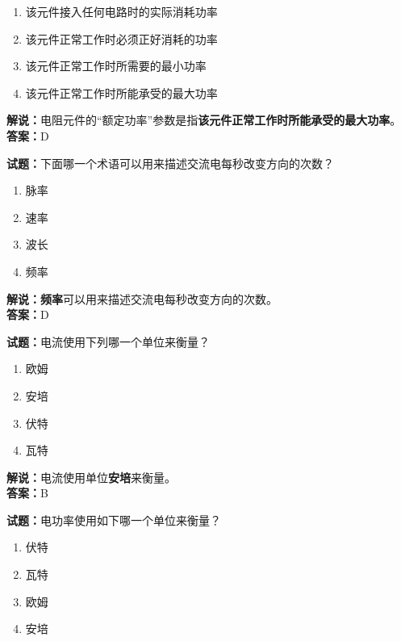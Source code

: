 \documentclass{ctexbook}
\begin{document}
\begin{enumerate}[leftmargin=3em]
	\item 该元件接入任何电路时的实际消耗功率
	\item 该元件正常工作时必须正好消耗的功率
	\item 该元件正常工作时所需要的最小功率
	\item 该元件正常工作时所能承受的最大功率
\end{enumerate}

\noindent\textbf{解说：}电阻元件的“额定功率”参数是指\textbf{该元件正常工作时所能承受的最大功率}。\\\noindent\textbf{答案：}D



\bigskip


\noindent\textbf{试题：}下面哪一个术语可以用来描述交流电每秒改变方向的次数？

\begin{enumerate}[leftmargin=3em]
	\item 脉率
	\item 速率
	\item 波长
	\item 频率
\end{enumerate}

\noindent\textbf{解说：}\textbf{频率}可以用来描述交流电每秒改变方向的次数。\\\noindent\textbf{答案：}D



\bigskip


\noindent\textbf{试题：}电流使用下列哪一个单位来衡量？

\begin{enumerate}[leftmargin=3em]
	\item 欧姆
	\item 安培
	\item 伏特
	\item 瓦特
\end{enumerate}

\noindent\textbf{解说：}电流使用单位\textbf{安培}来衡量。\\\noindent\textbf{答案：}B


\bigskip


\noindent\textbf{试题：}电功率使用如下哪一个单位来衡量？

\begin{enumerate}[leftmargin=3em]
	\item 伏特
	\item 瓦特
	\item 欧姆
	\item 安培
\end{enumerate}
\end{document}
